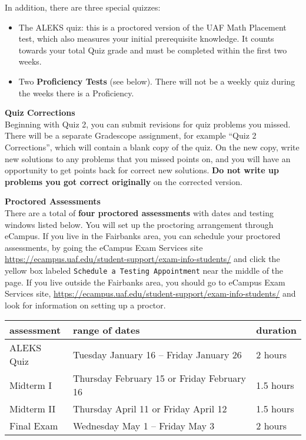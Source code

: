 \documentclass[12pt]{article}
\renewcommand{\emph}[1]{\textsf{\textbf{#1}}}
\newcommand{\localhead}[1]{\par\smallskip\textbf{#1}\nobreak\\}%
\def\heading#1{\localhead{\large\emph{#1}}}
\begin{document}
In addition, there are three special quizzes:
\begin{itemize}
\item The ALEKS quiz: this is a proctored version of the UAF Math Placement test, which also measures your initial prerequisite knowledge. It counts towards your total Quiz grade and must be completed within the first two weeks.
\item Two \emph{Proficiency Tests} (see below). There will not be a weekly quiz during the weeks there is a Proficiency.
\end{itemize}

\heading{Quiz Corrections}
Beginning with Quiz 2, you can submit revisions for quiz problems you missed. There will be a separate Gradescope assignment, for example ``Quiz 2 Corrections'', which will contain a blank copy of the quiz. On the new copy, write new solutions to any problems that you missed points on, and you will have an opportunity to get points back for correct new solutions. \emph{Do not write up problems you got correct originally} on the corrected version.

\heading{Proctored Assessments}
There are a total of \emph{four proctored assessments} with dates and testing windows listed below. You will set up the proctoring arrangement through eCampus.
If you live in the Fairbanks area, you can schedule your proctored assessments, by going the eCampus Exam Services site \url{https://ecampus.uaf.edu/student-support/exam-info-students/} and click the yellow box
labeled {\tt{Schedule a Testing Appointment}}
near the middle of the page.
If you live outside the Fairbanks area, you should go to eCampus Exam Services site, \url{ https://ecampus.uaf.edu/student-support/exam-info-students/} and look for information on setting up a proctor.

\begin{center}
\begin{tabular}{| l | l | l |}
\hline
assessment & range of dates & duration \\
\hline \hline
ALEKS Quiz & Tuesday January 16 -- Friday January 26 & 2 hours\\
\hline
Midterm I & Thursday February 15 or Friday February 16 & 1.5 hours \\
\hline
Midterm II & Thursday April 11 or Friday April 12 & 1.5 hours \\
\hline
Final Exam & Wednesday May 1 -- Friday May 3& 2 hours \\
\hline
\end{tabular}
\end{center}
\end{document}
